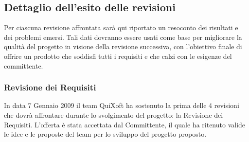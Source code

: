 \documentclass[11pt,a4paper]{article}
\begin{document}
\subsection{Dettaglio dell'esito delle revisioni}
Per ciascuna revisione affrontata sarà qui riportato un resoconto dei risultati e dei problemi emersi. Tali dati dovranno essere usati come base per migliorare la qualità del progetto in visione della revisione successiva, con l'obiettivo finale di offrire un prodotto che soddisfi tutti i requisiti e che calzi con le esigenze del committente.
\subsubsection{Revisione dei Requisiti}
In data 7 Gennaio 2009 il team QuiXoft ha sostenuto la prima delle 4 revisioni che dovrà affrontare durante lo svolgimento del progetto: la Revisione dei Requisiti.
L'offerta è stata accettata dal Committente, il quale ha ritenuto valide le idee e le proposte del team per lo sviluppo del progetto proposto.
\end{document}
